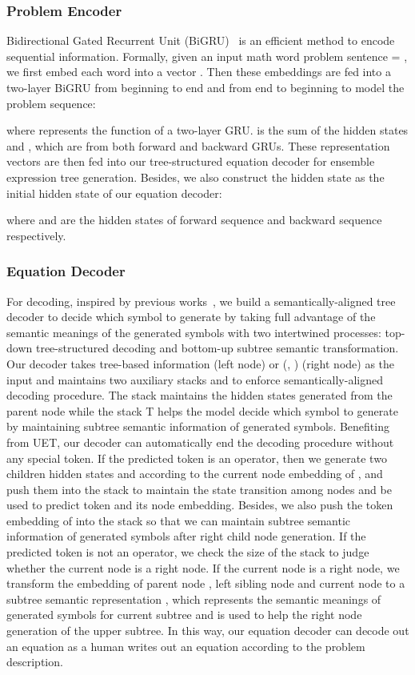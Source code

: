 \documentclass[11pt,a4paper]{article}
\begin{document}
\subsubsection{Problem Encoder}
Bidirectional Gated Recurrent Unit (BiGRU)~\cite{gru} is an efficient method to encode sequential information. Formally, given an input
math word problem sentence  = , we first embed each word into a vector . Then these embeddings are fed into a two-layer BiGRU from beginning to end and from end to beginning to model the problem sequence:

where  represents the function of a two-layer GRU.  is the sum of the hidden states
  and , which are from both forward and backward GRUs. These representation vectors are then fed into our tree-structured equation decoder for ensemble expression tree generation. Besides, we also 
construct the hidden state  as the initial hidden state of our equation decoder:

where  and  are the hidden states of forward sequence and backward sequence respectively.

\subsubsection{Equation Decoder}
For decoding, inspired by previous works~\cite{seq2tree,stackdecoder}, we build a semantically-aligned tree decoder to decide which symbol to generate by taking full advantage of the semantic meanings of the generated symbols with two intertwined processes: top-down tree-structured decoding and bottom-up subtree semantic transformation. Our decoder takes tree-based information  (left node) or (, ) (right node) as the input and maintains two auxiliary stacks  and  to enforce semantically-aligned decoding procedure. The stack  maintains the hidden states generated from the parent node while the stack T helps the model decide which symbol to generate by maintaining subtree semantic information of generated symbols. Benefiting from UET, our decoder can automatically end the decoding procedure without any special token. If the predicted token  is an operator, then we generate two children hidden states  and  according to the current node embedding  of , and push them into the stack  to maintain the state transition among nodes and be used to predict token and its node embedding. Besides, we also push the token embedding  of  into the stack  so that we can maintain subtree semantic information of generated symbols after right child node generation. If the predicted token  is not an operator, we check the size of the stack  to judge whether the current node is a right node. If the current node is a right node, we transform the embedding of parent node , left sibling node  and current node  to a subtree semantic representation , which represents the semantic meanings of generated symbols for current subtree and is used to help the right node generation of the upper subtree. In this way, our equation decoder can decode out an equation as a human writes out an equation according to the problem description.
\end{document}
